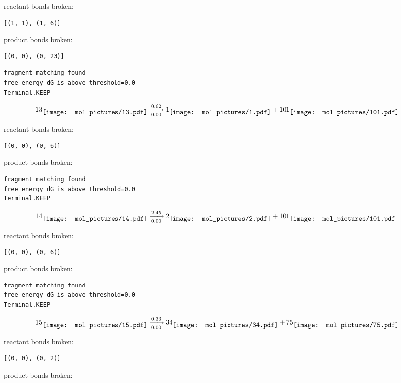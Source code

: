 \documentclass{article}
\begin{document}
reactant bonds broken:\begin{verbatim}
[(1, 1), (1, 6)]
\end{verbatim}
product bonds broken:\begin{verbatim}
[(0, 0), (0, 23)]
\end{verbatim}




\vspace{1cm}
\begin{verbatim}
fragment matching found
free_energy dG is above threshold=0.0
Terminal.KEEP
\end{verbatim}
$$
13
\raisebox{-.5\height}{\texttt{[image: mol\_pictures/13.pdf]}}
\xrightarrow[0.00]{0.62}
1
\raisebox{-.5\height}{\texttt{[image: mol\_pictures/1.pdf]}}
+
101
\raisebox{-.5\height}{\texttt{[image: mol\_pictures/101.pdf]}}
$$


reactant bonds broken:\begin{verbatim}
[(0, 0), (0, 6)]
\end{verbatim}
product bonds broken:



\vspace{1cm}
\begin{verbatim}
fragment matching found
free_energy dG is above threshold=0.0
Terminal.KEEP
\end{verbatim}
$$
14
\raisebox{-.5\height}{\texttt{[image: mol\_pictures/14.pdf]}}
\xrightarrow[0.00]{2.45}
2
\raisebox{-.5\height}{\texttt{[image: mol\_pictures/2.pdf]}}
+
101
\raisebox{-.5\height}{\texttt{[image: mol\_pictures/101.pdf]}}
$$


reactant bonds broken:\begin{verbatim}
[(0, 0), (0, 6)]
\end{verbatim}
product bonds broken:



\vspace{1cm}
\begin{verbatim}
fragment matching found
free_energy dG is above threshold=0.0
Terminal.KEEP
\end{verbatim}
$$
15
\raisebox{-.5\height}{\texttt{[image: mol\_pictures/15.pdf]}}
\xrightarrow[0.00]{0.33}
34
\raisebox{-.5\height}{\texttt{[image: mol\_pictures/34.pdf]}}
+
75
\raisebox{-.5\height}{\texttt{[image: mol\_pictures/75.pdf]}}
$$


reactant bonds broken:\begin{verbatim}
[(0, 0), (0, 2)]
\end{verbatim}
product bonds broken:
\end{document}
